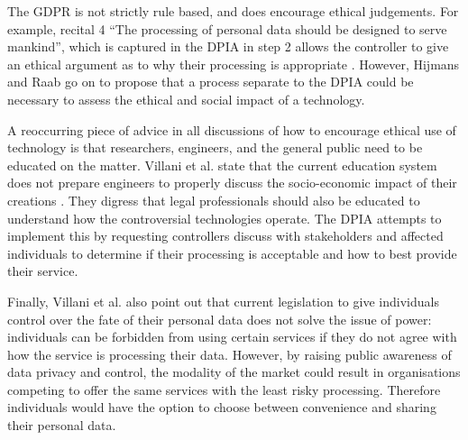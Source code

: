 \documentclass[12pt]{extarticle}
\begin{document}
The GDPR is not strictly rule based, and does encourage ethical judgements. 
For example, recital 4 ``The processing of personal data should be designed to serve mankind'', which is captured in the DPIA in step 2 allows the controller to give an ethical argument as to why their processing is appropriate \cite{recital4}.
However, Hijmans and Raab go on to propose that a process separate to the DPIA could be necessary to assess the ethical and social impact of a technology.

A reoccurring piece of advice in all discussions of how to encourage ethical use of technology is that researchers, engineers, and the general public need to be educated on the matter.
Villani et al. state that the current education system does not prepare engineers to properly discuss the socio-economic impact of their creations \cite{villani}.
They digress that legal professionals should also be educated to understand how the controversial technologies operate.
The DPIA attempts to implement this by requesting controllers discuss with stakeholders and affected individuals to determine if their processing is acceptable and how to best provide their service. 

Finally, Villani et al. also point out that current legislation to give individuals control over the fate of their personal data does not solve the issue of power: individuals can be forbidden from using certain services if they do not agree with how the service is processing their data. 
However, by raising public awareness of data privacy and control, the modality of the market could result in organisations competing to offer the same services with the least risky processing.
Therefore individuals would have the option to choose between convenience and sharing their personal data.

\printbibliography
\end{document}
